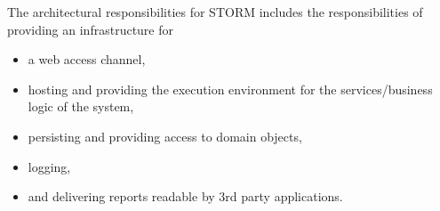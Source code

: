 The architectural responsibilities for STORM includes the responsibilities of providing an infrastructure for
\begin{itemize}
\item a web access channel,
\item hosting and providing the execution environment for the services/business logic of the system,
\item persisting and providing access to domain objects,
\item logging,
\item and delivering reports readable by 3rd party applications.
\end{itemize}